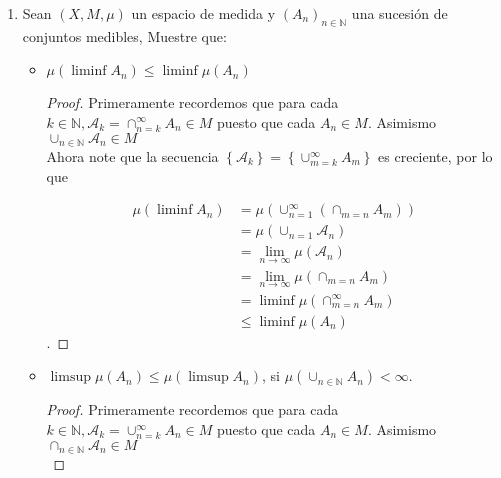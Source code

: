 \documentclass[spanish,12pt,a4paper,openany]{book}
\begin{document}
\begin{enumerate}
		$\limsup A_{n} = \cap_{n=1} ^{\infty} A_{n}= \liminf A_{n} $.
		
		\begin{proof}
			La prueba es análoga a la del punto anterior y se deja como ejercicio al lector.
		\end{proof}
		
		\item Sean $(X,M, \mu)$ un espacio de medida y $(A_{n})_{n \in \mathbb{N}}$ una sucesión de conjuntos medibles, Muestre que:\\
		
			\begin{itemize}
				\item  $\mu (\liminf A_{n}) \leq \liminf \mu (A_{n}) $
				
				\begin{proof}
					Primeramente recordemos que para cada  $ k \in  \mathbb{N}, \mathcal{A}_{k} = \cap_{n=k} ^{\infty} A_{n} \in M$ puesto que cada $A_{n} \in M$. Asimismo $\cup_{n \in \mathbb{N}} \mathcal{A}_{n} \in M$\\ 
					
					Ahora note que la secuencia $\left\{\mathcal{A}_{k}\right\} = \left\{\cup_{m=k} ^{\infty} A_{m}\right\}$  es creciente, por lo que
					
					\begin{align*}
						\mu (\liminf A_{n}) &= \mu (\cup_{n=1} ^{\infty} (\cap_{m=n} A_{m}))\\
											&= \mu (\cup_{n=1} \mathcal{A}_{n})\\
											&= \lim_{n \rightarrow \infty } \mu (\mathcal{A}_n)\\
											&= \lim_{n \rightarrow \infty } \mu (\cap_{m=n} A_{m})\\
											&= \liminf \mu (\cap_{m=n} ^{\infty} A_{m})\\
											&\leq \liminf \mu (A_{n}) 
					\end{align*}
.				\end{proof}
				
				\item  $\limsup \mu(A_{n}) \leq \mu (\limsup A_{n}) $, si $\mu(\cup_{n \in \mathbb{N}} A_{n} ) < \infty$.
					 
				\begin{proof}
					Primeramente recordemos que para cada  $ k \in  \mathbb{N}, \mathcal{A}_{k} = \cup_{n=k} ^{\infty} A_{n} \in M$ puesto que cada $A_{n} \in M$. Asimismo $\cap_{n \in \mathbb{N}} \mathcal{A}_{n} \in M$\\ 
					

\end{proof}
\end{itemize}
\end{enumerate}
\end{document}
